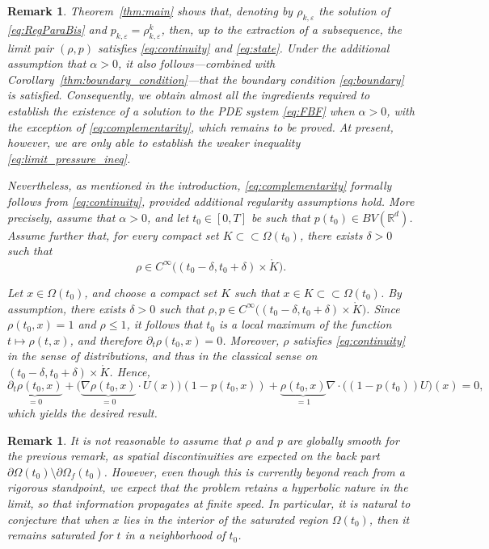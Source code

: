 \documentclass[11pt,twoside]{article}
\numberwithin{equation}{section}
\newtheorem{remark}[theorem]{Remark}
\begin{document}
\begin{remark}
Theorem~\ref{thm:main} shows that, denoting by  \(\rho_{k,\varepsilon}\) the solution of \eqref{eq:RegParaBis} and \(p_{k,\varepsilon} = \rho_{k,\varepsilon}^k\), then, up to the extraction of a subsequence, the limit pair \((\rho,p)\) satisfies \eqref{eq:continuity} and \eqref{eq:state}. Under the additional assumption that \(\alpha > 0\), it also follows—combined with Corollary~\ref{thm:boundary_condition}—that the boundary condition \eqref{eq:boundary} is satisfied. Consequently, we obtain almost all the ingredients required to establish the existence of a solution to the PDE system \eqref{eq:FBF} when \(\alpha > 0\), with the exception of \eqref{eq:complementarity}, which remains to be proved. At present, however, we are only able to establish the weaker inequality \eqref{eq:limit_pressure_ineq}.

Nevertheless, as mentioned in the introduction, \eqref{eq:complementarity} formally follows from \eqref{eq:continuity}, provided additional regularity assumptions hold. More precisely, assume that \(\alpha > 0\), and let \(t_0 \in [0,T]\) be such that \(p(t_0) \in BV(\mathbb{R}^d)\). Assume further that, for every compact set \(K \subset\subset \Omega(t_0)\), there exists \(\delta > 0\) such that
\[
\rho \in C^\infty\big((t_0-\delta,t_0+\delta)\times \mathring{K}\big).
\]

Let \(x \in \Omega(t_0)\), and choose a compact set \(K\) such that \(x \in K \subset\subset \Omega(t_0)\). By assumption, there exists \(\delta > 0\) such that \(\rho, p \in C^\infty\big((t_0-\delta,t_0+\delta)\times \mathring{K}\big)\). Since \(\rho(t_0,x) = 1\) and \(\rho \leq 1\), it follows that \(t_0\) is a local maximum of the function \(t \mapsto \rho(t,x)\), and therefore \(\partial_t \rho(t_0,x) = 0\). Moreover, \(\rho\) satisfies \eqref{eq:continuity} in the sense of distributions, and thus in the classical sense on \((t_0-\delta,t_0+\delta)\times \mathring{K}\). Hence,
\[
\underbrace{\partial_t\rho(t_0,x)}_{=0}
+ \big(\underbrace{\nabla \rho(t_0,x)}_{=0}\cdot U(x)\big)(1-p(t_0,x))
+ \underbrace{\rho(t_0,x)}_{=1}
\nabla \cdot\big((1-p(t_0))U\big)(x)
= 0,
\]
which yields the desired result.
\end{remark}

\begin{remark}
It is not reasonable to assume that $\rho$ and $p$ are globally smooth for the previous remark, as spatial discontinuities are expected on the back part $\partial \Omega(t_0)\setminus \partial \Omega_f(t_0)$. 
However, even though this is currently beyond reach from a rigorous standpoint, we expect that the problem retains a hyperbolic nature in the limit, so that information propagates at finite speed. In particular, it is natural to conjecture that when $x$ lies in the interior of the saturated region $\Omega(t_0)$, then it remains saturated for $t$ in a neighborhood of $t_0$.
\end{remark}
\end{document}
